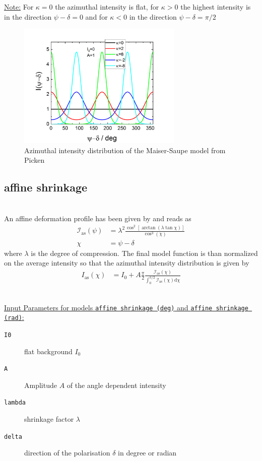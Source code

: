 \underline{Note:}
For $\kappa=0$ the azimuthal intensity is flat, for $\kappa>0$ the highest intensity is in the direction $\psi-\delta=0$ and for $\kappa<0$ in the direction $\psi-\delta=\pi/2$

\begin{figure}[htb]
\begin{center}
\includegraphics[width=0.7\textwidth]{../images/form_factor/azimuthal/maiersaupe.png}
\end{center}
\caption{Azimuthal intensity distribution of the Maiser-Saupe model from Picken \cite{Picken1990}}
\label{fig:maiersaupe}
\end{figure}

\subsection{affine shrinkage} ~\\
An affine deformation  profile has been given by \cite{Vilcinskas2015,Zlopasa2015} and reads as
\begin{align}
\mathcal{I}_\mathrm{as}(\psi) &= \lambda^2\frac{\cos^2\left[\arctan\left(\lambda \tan \chi\right)\right]}{\cos^3(\chi)} \\
\chi &= \psi-\delta
\end{align}
where $\lambda$ is the degree of compression. The final model function is than normalized on the average intensity so that the azimuthal intensity distribution is given by
\begin{align}
  I_\mathrm{as}(\chi) &= I_0 + A \frac{\pi}{2}\frac{\mathcal{I}_\mathrm{as}(\chi)}{\int_0^{\pi/2}\mathcal{I}_\mathrm{as}(\chi)\mathrm{d}\chi}
\end{align}

\hspace{1pt}\\
\underline{Input Parameters for models \texttt{affine shrinkage (deg)} and \texttt{affine shrinkage (rad)}:}\\
\begin{description}
\item[\texttt{I0}] flat background $I_0$
\item[\texttt{A}] Amplitude $A$ of the angle dependent intensity 
\item[\texttt{lambda}] shrinkage factor $\lambda$
\item[\texttt{delta}] direction of the polarisation $\delta$ in degree or radian
\end{description}

